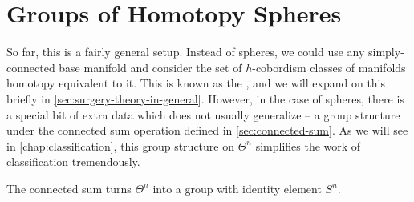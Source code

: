 \pagebreak
\section{Groups of Homotopy Spheres}\label{sec:groups-of-homotopy-spheres}

So far, this is a fairly general setup. Instead of spheres, we could use any simply-connected base manifold and consider the set of $h$-cobordism classes of manifolds homotopy equivalent to it. This is known as the , and we will expand on this briefly in \cref{sec:surgery-theory-in-general}. However, in the case of spheres, there is a special bit of extra data which does not usually generalize -- a group structure under the connected sum operation defined in \cref{sec:connected-sum}. 
As we will see in \cref{chap:classification}, this group structure on $\Theta^n$ simplifies the work of classification tremendously.

\begin{theorem}\label{thm:group-of-homotopy-spheres}
	The connected sum turns $\Theta^n$ into a group with identity element $S^n$.
\end{theorem}

